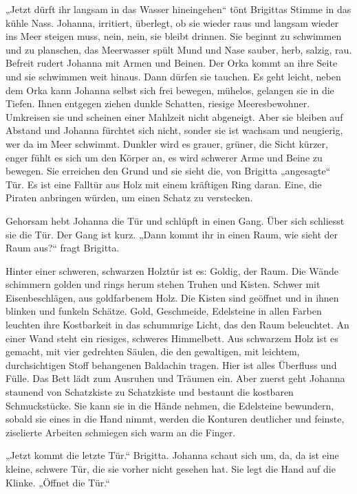 \documentclass[10pt,titlepage,a5paper]{book}
\begin{document}
„Jetzt dürft ihr langsam in das Wasser hineingehen“ tönt Brigittas Stimme in das kühle Nass. Johanna, irritiert, überlegt, ob sie wieder raus und langsam wieder ins Meer steigen muss, nein, nein, sie bleibt drinnen. 
Sie beginnt zu schwimmen und zu planschen, das Meerwasser spült Mund und Nase sauber, herb, salzig, rau. Befreit rudert Johanna  mit Armen und Beinen. Der Orka kommt an ihre Seite und sie schwimmen weit hinaus. Dann dürfen sie tauchen. Es geht leicht, neben dem Orka kann Johanna selbst sich frei bewegen, mühelos, gelangen sie in  die Tiefen. Ihnen entgegen ziehen dunkle Schatten, riesige Meeresbewohner. Umkreisen sie und scheinen einer Mahlzeit nicht abgeneigt. Aber sie bleiben auf Abstand und Johanna fürchtet sich nicht, sonder sie ist  wachsam und neugierig, wer da im Meer schwimmt. Dunkler wird es grauer, grüner, die Sicht kürzer, enger fühlt es sich um den Körper an, es wird schwerer Arme und Beine zu bewegen. Sie erreichen den Grund und sie sieht die, von Brigitta „angesagte“ Tür. Es ist eine Falltür aus Holz mit einem kräftigen Ring daran. Eine, die Piraten anbringen würden, um einen Schatz zu verstecken.

Gehorsam hebt Johanna die Tür und schlüpft in einen Gang. Über sich schliesst sie die Tür.  Der Gang ist kurz. „Dann kommt ihr in einen Raum, wie sieht der Raum aus?“ fragt Brigitta. 

Hinter einer schweren, schwarzen Holztür ist es: Goldig, der Raum. Die Wände schimmern golden und rings herum stehen Truhen und Kisten. Schwer mit Eisenbeschlägen, aus goldfarbenem Holz. Die Kisten sind geöffnet und in ihnen blinken und funkeln Schätze. Gold, Geschmeide, Edelsteine in allen Farben leuchten ihre Kostbarkeit in das schummrige Licht, das den Raum beleuchtet. An einer Wand steht ein riesiges, schweres Himmelbett. Aus schwarzem Holz ist es gemacht, mit vier gedrehten Säulen, die den gewaltigen, mit leichtem, durchsichtigen Stoff behangenen Baldachin tragen. Hier ist alles Überfluss und Fülle. Das Bett lädt zum Ausruhen und Träumen ein. Aber zuerst geht Johanna staunend von Schatzkiste zu Schatzkiste und bestaunt die kostbaren Schmuckstücke. Sie kann sie in die Hände nehmen, die Edelsteine bewundern, sobald sie eines in die Hand nimmt, werden die Konturen deutlicher und feinste, ziselierte Arbeiten schmiegen sich warm an die Finger.

„Jetzt kommt die letzte Tür.“ Brigitta. Johanna schaut sich um, da, da ist eine kleine, schwere Tür, die sie vorher nicht gesehen hat. Sie legt die Hand auf die Klinke. „Öffnet die Tür.“
\end{document}
